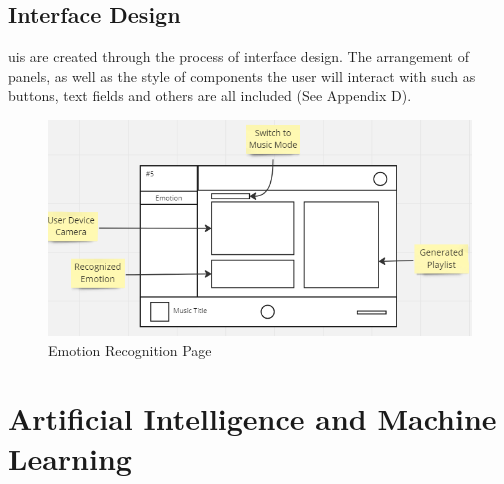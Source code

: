 \subsection{Interface Design}
\gls{ui}s are created through the process of interface design.
The arrangement of panels, as well as the style of components the user will interact with such as buttons, text fields and others are all included (See Appendix D).
\begin{figure}[H]
    \centering
    \includegraphics[width=12cm]{Images/detection.png}
    \caption{Emotion Recognition Page}
    \label{fig:emotion-recog}
\end{figure}

\section{Artificial Intelligence and Machine Learning}
